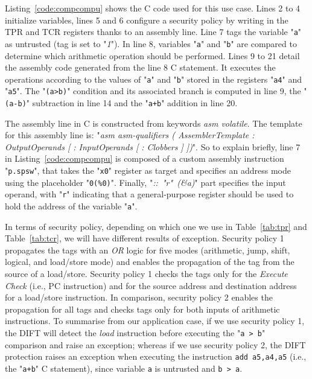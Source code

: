 Listing~\ref{code:compcompu} shows the C code used for this use case. Lines 2 to 4 initialize variables, lines 5 and 6 configure a security policy by writing in the TPR and TCR registers thanks to an assembly line. Line 7 tags the variable "\verb|a|" as untrusted (tag is set to "\textit{1}"). In line 8, variables "\verb|a|" and "\verb|b|" are compared to determine which arithmetic operation should be performed.
Lines 9 to 21 detail the assembly code generated from the line 8 C statement. It executes the operations according to the values of "\verb|a|" and "\verb|b|" stored in the registers "\verb|a4|" and "\verb|a5|". The "\verb|(a>b)|" condition and its associated branch is computed in line 9, the "\verb|(a-b)|" subtraction in line 14 and the "\verb|a+b|" addition in line 20.

The assembly line in C is constructed from keywords \textit{asm volatile}. The template for this assembly line is: "\textit{asm asm-qualifiers ( AssemblerTemplate : OutputOperands [ : InputOperands [ : Clobbers ] ])}".
So to explain briefly,
 line 7 in Listing~\ref{code:compcompu} is composed of a custom assembly instruction "\texttt{p.spsw}", that takes the "\texttt{x0}" register as target and specifies an address mode using the placeholder "\texttt{0(\%0)}". Finally, \mbox{"\textit{:: "r" (\&a)}"} part specifies the input operand, with "\texttt{r}" indicating that a general-purpose register should be used to hold the address of the variable "\texttt{a}".

In terms of security policy, depending on which one we use in Table~\ref{tab:tpr} and Table~\ref{tab:tcr}, we will have different results of exception.
Security policy 1 propagates the tags with an \textit{OR} logic for five modes (arithmetic, jump, shift, logical, and load/store mode) and enables the propagation of the tag from the source of a load/store.
Security policy 1 checks the tags only for the \textit{Execute Check} (i.e., PC instruction) and for the source address and destination address for a load/store instruction.
In comparison, security policy 2 enables the propagation for all tags and checks tags only for both inputs of arithmetic instructions.
To summarise from our application case, if we use security policy 1, the DIFT will detect the \textit{load} instruction before executing the "\verb|a > b|"
 comparison and raise an exception; whereas if we use security policy 2, the DIFT protection raises an exception when executing the instruction \verb|add a5,a4,a5| (i.e., the "\verb|a+b|" C statement), since variable \verb|a| is untrusted and \verb|b > a|.

